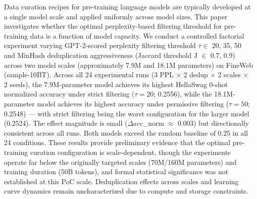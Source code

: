 
Data curation recipes for pre-training language models are typically developed at a single model scale and applied uniformly across model sizes. This paper investigates whether the optimal perplexity-based filtering threshold for pre-training data is a function of model capacity. We conduct a controlled factorial experiment varying GPT-2-scored perplexity filtering threshold $\tau \in$ {20, 35, 50} and MinHash deduplication aggressiveness (Jaccard threshold J $\in$ {0.7, 0.9}) across two model scales (approximately 7.9M and 18.1M parameters) on FineWeb (sample-10BT). Across all 24 experimental runs (3 PPL $\times$ 2 dedup $\times$ 2 scales $\times$ 2 seeds), the 7.9M-parameter model achieves its highest HellaSwag 0-shot normalized accuracy under strict filtering ($\tau =20$; 0.2556), while the 18.1M-parameter model achieves its highest accuracy under permissive filtering ($\tau =50$; 0.2548) --- with strict filtering being the worst configuration for the larger model (0.2524). The effect magnitude is small ($\Delta acc$\_norm $\approx$ 0.003) but directionally consistent across all runs. Both models exceed the random baseline of 0.25 in all 24 conditions. These results provide preliminary evidence that the optimal pre-training curation configuration is scale-dependent, though the experiments operate far below the originally targeted scales (70M/160M parameters) and training duration (50B tokens), and formal statistical significance was not established at this PoC scale. Deduplication effects across scales and learning curve dynamics remain uncharacterized due to compute and storage constraints.
